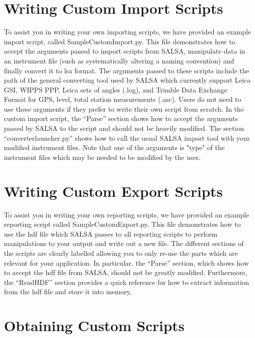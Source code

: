 \section{Writing Custom Import Scripts}

To assist you in writing your own importing scripts, we have provided an example import script, called SampleCustomImport.py.  This file demonstrates how to accept the arguments passed to import scripts from SALSA, manipulate data in an instrument file (such as systematically altering a naming convention) and finally convert it to lsa format.  The arguments passed to these scripts include the path of the general converting tool used by SALSA which currently support Leica GSI, WIPPS PPP, Leica sets of angles (.log), and Trimble Data Exchange Format for GPS, level, total station measurements (.asc).  Users do not need to use these arguments if they prefer to write their own script from scratch.  In the custom import script, the ``Parse'' section shows how to accept the arguments passed by SALSA to the script and should not be heavily modified.  The section ``converterlauncher.py'' shows how to call the usual SALSA import tool with your modified instrument files.  Note that one of the arguments is "type" of the instrument files which may be needed to be modified by the user.

\section{Writing Custom Export Scripts}

To assist you in writing your own reporting scripts, we have provided an example reporting script called SampleCustomExport.py.  This file demonstrates how to use the hdf file which SALSA passes to all reporting scripts to perform manipulations to your output and write out a new file.  The different sections of the scripts are clearly labelled allowing you to only re-use the parts which are relevant for your application.  In particular, the ``Parse'' section, which shows how to accept the hdf file from SALSA, should not be greatly modified.  Furthermore, the ``ReadHDF'' section provides a quick reference for how to extract information from the hdf file and store it into memory.
\section{Obtaining Custom Scripts}

